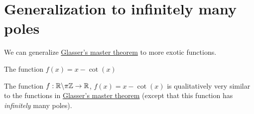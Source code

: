\documentclass[main.tex]{subfiles}
\begin{document}
\section{Generalization to infinitely many poles}

We can generalize \hyperref[glassers_master_theorem]{Glasser's master theorem} to more exotic functions.

\begin{diagrambox}{The function $f(x)=x-\cot(x)$}
    
    
    The function $f:\R\exc\pi\Z\to\R$, $f(x)=x-\cot(x)$ is qualitatively very similar to the functions in \hyperref[glassers_master_theorem]{Glasser's master theorem} (except that this function has \emph{infinitely} many poles).
\end{diagrambox}
\end{document}
